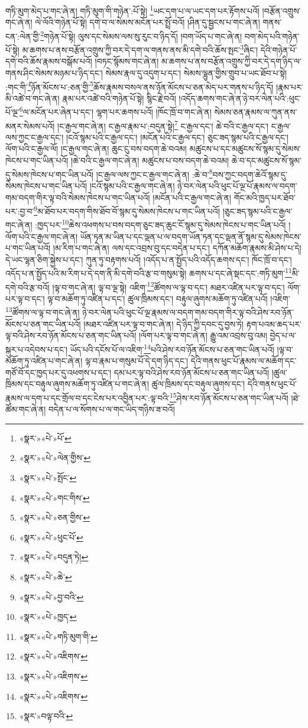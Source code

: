 གཏི་མུག་མེད་པ་གང་ཞེ་ན། གཏི་མུག་གི་གཉེན་:པོ་སྟེ། \footnote{«སྣར་»«པེ་»པོ་}ཡང་དག་པ་ལ་ཡང་དག་པར་རྟོགས་པའོ། །བརྩོན་འགྲུས་གང་ཞེ་ན། ལེ་ལོའི་གཉེན་པོ་སྟེ། དགེ་བ་ལ་སེམས་མངོན་པར་སྤྲོ་བའོ། །ཤིན་དུ་སྦྱངས་པ་གང་ཞེ་ན། གནས་ངན་:ལེན་གྱི་\footnote{«སྣར་»«པེ་»ལེན་གྱིས་}གཉེན་པོ་སྟེ། ལུས་དང་སེམས་ལས་སུ་རུང་བ་ཉིད་དོ། །བག་ཡོད་པ་གང་ཞེ་ན། བག་མེད་པའི་གཉེན་པོ་སྟེ། མ་ཆགས་པ་ནས་བརྩོན་འགྲུས་ཀྱི་བར་དེ་དག་ལ་གནས་ནས་མི་དགེ་བའི་ཆོས་སྤང་\footnote{«སྣར་»«པེ་»སྤོང་}ཞིང་། དེའི་གཉེན་པོ་དགེ་བའི་ཆོས་རྣམས་བསྒོམ་པའོ། །བཏང་སྙོམས་གང་ཞེ་ན། མ་ཆགས་པ་ནས་བརྩོན་འགྲུས་ཀྱི་བར་དེ་དག་ཉིད་ལ་གནས་ཤིང་སེམས་མཉམ་པ་ཉིད་དང་། སེམས་རྣལ་དུ་འདུག་པ་དང་། སེམས་ལྷུན་གྱིས་གྲུབ་པ་ཡང་ཐོབ་པ་སྟེ། :གང་གི་\footnote{«སྣར་»«པེ་»གང་གིས་}ཉོན་མོངས་པ་:ཅན་གྱི་\footnote{«སྣར་»«པེ་»ཅན་གྱིས་}ཆོས་རྣམས་བསལ་ནས་ཉོན་མོངས་པ་ཅན་མེད་པར་གནས་པ་ཉིད་དོ། །རྣམ་པར་མི་འཚེ་བ་གང་ཞེ་ན། རྣམ་པར་འཚེ་བའི་གཉེན་པོ་སྟེ། སྙིང་རྗེ་བའོ། །འདོད་ཆགས་གང་ཞེ་ན་ཉེ་བར་ལེན་པའི་:ཕུང་པོ་ལྔ་\footnote{«སྣར་»«པེ་»ཕུང་པོ་}ལ་མངོན་པར་ཞེན་པ་དང་། ལྷག་པར་ཆགས་པའོ། །ཁོང་ཁྲོ་བ་གང་ཞེ་ན། སེམས་ཅན་རྣམས་ལ་ཀུན་ནས་མནར་སེམས་པའོ། །ང་རྒྱལ་གང་ཞེ་ན། ང་རྒྱལ་རྣམ་པ་:བདུན་སྟེ།\footnote{«སྣར་»«པེ་»བདུན་ཏེ།} ང་རྒྱལ་དང་། ཆེ་བའི་ང་རྒྱལ་དང་། ང་རྒྱལ་ལས་ཀྱང་ང་རྒྱལ་དང་། །ངའོ་སྙམ་པའི་ང་རྒྱལ་དང་། །མངོན་པའི་ང་རྒྱལ་དང་། ཅུང་ཟད་སྙམ་པའི་ང་རྒྱལ་དང་། ལོག་པའི་ང་རྒྱལ་ལོ། །ང་རྒྱལ་གང་ཞེ་ན། ཆུང་ངུ་བས་བདག་ཆེ་བའམ། མཚུངས་པ་དང་མཚུངས་སོ་སྙམ་དུ་སེམས་ཁེངས་པ་གང་ཡིན་པའོ། །ཆེ་བའི་ང་རྒྱལ་གང་ཞེ་ན། མཚུངས་པ་བས་བདག་ཆེ་བའམ། ཆེ་བ་དང་མཚུངས་སོ་སྙམ་དུ་སེམས་ཁེངས་པ་གང་ཡིན་པའོ། །ང་རྒྱལ་ལས་ཀྱང་ང་རྒྱལ་གང་ཞེ་ན། :ཆེ་བ་\footnote{«སྣར་»«པེ་»ཆེ་}བས་ཀྱང་བདག་ཆེའོ་སྙམ་དུ་སེམས་ཁེངས་པ་གང་ཡིན་པའོ། །ངའོ་སྙམ་པའི་ང་རྒྱལ་གང་ཞེ་ན། ཉེ་བར་ལེན་པའི་ཕུང་པོ་ལྔ་པོ་རྣམས་ལ་བདག་གམ་བདག་གིར་ལྟ་བའི་སེམས་ཁེངས་པ་གང་ཡིན་པའོ། །མངོན་པའི་ང་རྒྱལ་གང་ཞེ་ན། གོང་མའི་ཁྱད་པར་ཐོབ་པར་:བྱ་བ་\footnote{«སྣར་»«པེ་»བྱ་བའི་}མ་ཐོབ་པར་བདག་གིས་ཐོབ་བོ་སྙམ་དུ་སེམས་ཁེངས་པ་གང་ཡིན་པའོ། །ཅུང་ཟད་སྙམ་པའི་ང་རྒྱལ་གང་ཞེ་ན། :ཁྱད་པར་\footnote{«སྣར་»«པེ་»ཁྱད་}ཆེས་འཕགས་པ་བས་བདག་ཅུང་ཟད་ཆུང་ངོ་སྙམ་དུ་སེམས་ཁེངས་པ་གང་ཡིན་པའོ། །ལོག་པའི་ང་རྒྱལ་གང་ཞེ་ན། ཡོན་ཏན་མ་ཡིན་པ་དང་ལྡན་པ་ལ་བདག་ཡོན་ཏན་དང་ལྡན་ནོ་སྙམ་དུ་སེམས་ཁེངས་པ་གང་ཡིན་པའོ། །མ་རིག་པ་གང་ཞེ་ན། ལས་དང་འབྲས་བུ་དང་བདེན་པ་དང་། དཀོན་མཆོག་རྣམས་མི་ཤེས་པ་དེ། དེ་ཡང་ལྷན་ཅིག་སྐྱེས་པ་དང་། ཀུན་ཏུ་བརྟགས་པའོ། །འདོད་པ་ན་སྤྱོད་པའི་འདོད་ཆགས་དང་། ཁོང་ཁྲོ་བ་དང་། འདོད་པ་ན་སྤྱོད་པའི་མ་རིག་པ་དེ་དག་ནི་མི་དགེ་བའི་རྩ་བ་གསུམ་སྟེ། ཆགས་པ་དང་ཞེ་སྡང་དང་:གཏི་མུག་\footnote{«སྣར་»«པེ་»གཏི་མུག་གི་}མི་དགེ་བའི་རྩ་བའོ། །ལྟ་བ་གང་ཞེ་ན། ལྟ་བ་ལྔ་སྟེ། འཇིག་\footnote{«སྣར་»«པེ་»འཇིགས་}ཚོགས་ལ་ལྟ་བ་དང་། མཐར་འཛིན་པར་ལྟ་བ་དང་། ལོག་པར་ལྟ་བ་དང་། ལྟ་བ་མཆོག་ཏུ་འཛིན་པ་དང་། ཚུལ་ཁྲིམས་དང་། བརྟུལ་ཞུགས་མཆོག་ཏུ་འཛིན་པའོ། །འཇིག་\footnote{«སྣར་»«པེ་»འཇིགས་}ཚོགས་ལ་ལྟ་བ་གང་ཞེ་ན། ཉེ་བར་ལེན་པའི་ཕུང་པོ་ལྔ་རྣམས་ལ་བདག་གམ་བདག་གིར་ལྟ་བའི་ཤེས་རབ་ཉོན་མོངས་པ་ཅན་གང་ཡིན་པའོ། །མཐར་འཛིན་པར་ལྟ་བ་གང་ཞེ་ན། དེ་ཉིད་ཀྱི་དབང་དུ་བྱས་ཏེ། རྟག་པའམ་ཆད་པར་ལྟ་བའི་ཤེས་རབ་ཉོན་མོངས་པ་ཅན་གང་ཡིན་པའོ། །ལོག་པར་ལྟ་བ་གང་ཞེ་ན། རྒྱུ་འམ་འབྲས་བུ་འམ། བྱེད་པ་ལ་སྐུར་པ་འདེབས་པ་དང་། ཡོད་པའི་དངོས་པོ་ལ་འཇིག་\footnote{«སྣར་»«པེ་»འཇིགས་}པའི་ཤེས་རབ་ཉོན་མོངས་པ་ཅན་གང་ཡིན་པའོ། །ལྟ་བ་མཆོག་ཏུ་འཛིན་པ་གང་ཞེ་ན། ལྟ་བ་རྣམ་པ་གསུམ་པོ་དེ་དག་ཉིད་དང་། དེའི་གནས་ཕུང་པོ་རྣམས་ལ་མཆོག་དང་གཙོ་བོ་དང་ཁྱད་པར་དུ་འཕགས་པ་དང་། དམ་པར་ལྟ་བའི་ཤེས་རབ་ཉོན་མོངས་པ་ཅན་གང་ཡིན་པའོ། །ཚུལ་ཁྲིམས་དང་བརྟུལ་ཞུགས་མཆོག་ཏུ་འཛིན་པ་གང་ཞེ་ན། ཚུལ་ཁྲིམས་དང་བརྟུལ་ཞུགས་དང་། དེའི་གནས་ཕུང་པོ་རྣམས་ལ་དག་པ་དང་གྲོལ་བ་དང་ངེས་པར་འབྱིན་པར་:ལྟ་བའི་\footnote{«སྣར་»བལྟ་བའི་}ཤེས་རབ་ཉོན་མོངས་པ་ཅན་གང་ཡིན་པའོ། །ཐེ་ཚོམ་གང་ཞེ་ན། བདེན་པ་ལ་སོགས་པ་ལ་གང་ཡིད་གཉིས་ཟ་བའོ། 